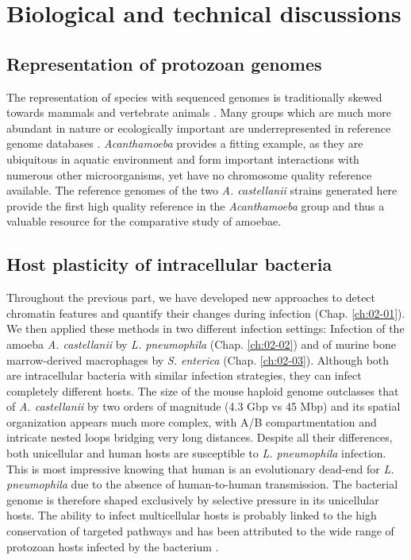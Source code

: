 
\chapter{Biological and technical discussions} %
\label{ch:03-01} %

\section{Representation of protozoan genomes}

The representation of species with sequenced genomes is traditionally skewed towards mammals and vertebrate animals \cite{hotalingGenomeSequenceEvery2021}. Many groups which are much more abundant in nature or ecologically important are underrepresented in reference genome databases \cite{davidSequencingDisparityGenomic2019}. \textit{Acanthamoeba} provides a fitting example, as they are ubiquitous in aquatic environment and form important interactions with numerous other microorganisms, yet have no chromosome quality reference available. The reference genomes of the two \textit{A. castellanii} strains generated here provide the first high quality reference in the \textit{Acanthamoeba} group and thus a valuable resource for the comparative study of amoebae.

\section{Host plasticity of intracellular bacteria}

Throughout the previous part, we have developed new approaches to detect chromatin features and quantify their changes during infection (Chap. \ref{ch:02-01}). We then applied these methods in two different infection settings: Infection of the amoeba \textit{A. castellanii} by \textit{L. pneumophila} (Chap. \ref{ch:02-02}) and of murine bone marrow-derived macrophages by \textit{S. enterica} (Chap. \ref{ch:02-03}). Although both are intracellular bacteria with similar infection strategies, they can infect completely different hosts. The size of the mouse haploid genome outclasses that of \textit{A. castellanii} by two orders of magnitude (4.3 Gbp vs 45 Mbp) and its spatial organization appears much more complex, with A/B compartmentation and intricate nested loops bridging very long distances. Despite all their differences, both unicellular and human hosts are susceptible to \textit{L. pneumophila} infection. This is most impressive knowing that human is an evolutionary dead-end for \textit{L. pneumophila} due to the absence of human-to-human transmission. The bacterial genome is therefore shaped exclusively by selective pressure in its unicellular hosts. The ability to infect multicellular hosts is probably linked to the high conservation of targeted pathways and has been attributed to the wide range of protozoan hosts infected by the bacterium \cite{molofskyDifferentiateThriveLessons2004}.

